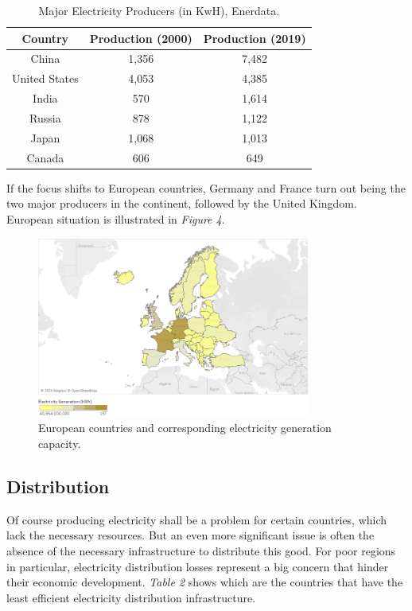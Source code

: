 \documentclass{book}
\begin{document}
\bigskip
\begin{table}[H]
\begin{center}
\begin{tabular}{|c|c|c|}
\hline
Country & Production (2000) & Production (2019)\\
\hline
China & 1,356 & 7,482\\
United States & 4,053 & 4,385\\
India & 570 & 1,614\\
Russia & 878 & 1,122\\
Japan & 1,068 & 1,013\\
Canada & 606 & 649\\
\hline
\end{tabular}
\caption{Major Electricity Producers (in KwH), Enerdata.}
\end{center}
\end{table}

If the focus shifts to European countries, Germany and France turn out being the two major producers in the continent, followed by the United Kingdom. European situation is illustrated in \textit{Figure 4}.

\bigskip
\begin{figure}[H]
\begin{center}
\captionsetup{justification=centering}
\includegraphics[width=0.8\textwidth]{Images/prod.png}
\caption{European countries and corresponding electricity generation capacity. }
\end{center}
\end{figure}
\bigskip

\subsection*{Distribution}

Of course producing electricity shall be a problem for certain countries, which lack the necessary resources. But an even more significant issue is often the absence of the necessary infrastructure to distribute this good. For poor regions in particular, electricity distribution losses represent  a big concern that hinder their economic development. \textit{Table 2} shows which are the countries that have the least efficient electricity distribution infrastructure.
\end{document}
